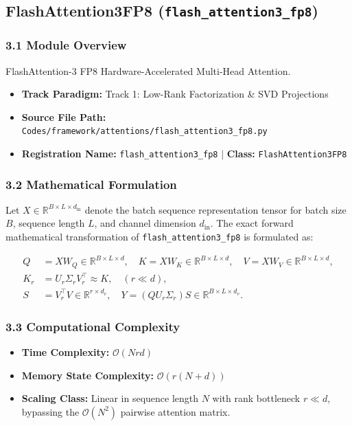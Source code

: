 \subsection{FlashAttention3FP8 (\texttt{flash\_attention3\_fp8})}
\label{sec:app_module_flash_attention3_fp8}

\subsubsection*{3.1 Module Overview}
FlashAttention-3 FP8 Hardware-Accelerated Multi-Head Attention.
\begin{itemize}
    \item \textbf{Track Paradigm:} Track 1: Low-Rank Factorization \& SVD Projections
    \item \textbf{Source File Path:} \texttt{Codes/framework/attentions/flash\_attention3\_fp8.py}
    \item \textbf{Registration Name:} \texttt{flash\_attention3\_fp8} $\mid$ \textbf{Class:} \texttt{FlashAttention3FP8}
\end{itemize}

\subsubsection*{3.2 Mathematical Formulation}
Let $X \in \mathbb{R}^{B \times L \times d_{\text{in}}}$ denote the batch sequence representation tensor for batch size $B$, sequence length $L$, and channel dimension $d_{\text{in}}$. The exact forward mathematical transformation of \texttt{flash\_attention3\_fp8} is formulated as:

\begin{align}
Q &= X W_Q \in \mathbb{R}^{B \times L \times d}, \quad K = X W_K \in \mathbb{R}^{B \times L \times d}, \quad V = X W_V \in \mathbb{R}^{B \times L \times d}, \\
K_r &= U_r \Sigma_r V_r^\top \approx K, \quad (r \ll d), \\
S &= V_r^\top V \in \mathbb{R}^{r \times d_v}, \quad Y = (Q U_r \Sigma_r) S \in \mathbb{R}^{B \times L \times d_v}.
\end{align}


\subsubsection*{3.3 Computational Complexity}
\begin{itemize}
    \item \textbf{Time Complexity:} $\mathcal{O}(N r d)$
    \item \textbf{Memory State Complexity:} $\mathcal{O}(r(N + d))$
    \item \textbf{Scaling Class:} Linear in sequence length $N$ with rank bottleneck $r \ll d$, bypassing the $\mathcal{O}(N^2)$ pairwise attention matrix.
\end{itemize}

